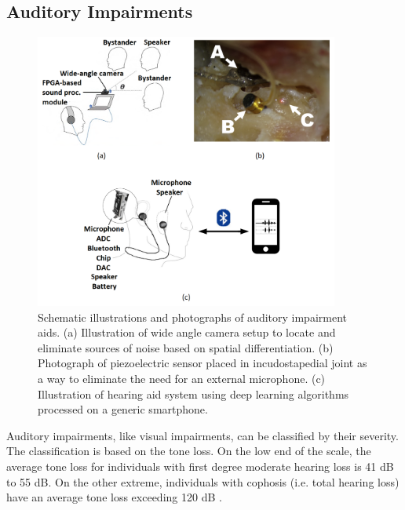 \subsection{Auditory Impairments}
\begin{figure}[h!]
    \centering
    \includegraphics[width=100mm]{Figure/SensoryAid/AICollage}
    \caption{Schematic illustrations and photographs of auditory impairment aids. (a) Illustration of wide angle camera setup to locate and eliminate sources of noise based on spatial differentiation. (b) Photograph of piezoelectric sensor placed in incudostapedial joint as a way to eliminate the need for an external microphone. (c) Illustration of hearing aid system using deep learning algorithms processed on a generic smartphone.}
    \label{fig:SensAidCollage}
\end{figure}
\tab Auditory impairments, like visual impairments, can be classified by their severity. The classification is based on the tone loss. On the low end of the scale, the average tone loss for individuals with first degree moderate hearing loss is 41 dB to 55 dB. On the other extreme, individuals with cophosis (i.e. total hearing loss) have an average tone loss exceeding 120 dB \parencite{IBFA_audiometric_1996}. 

